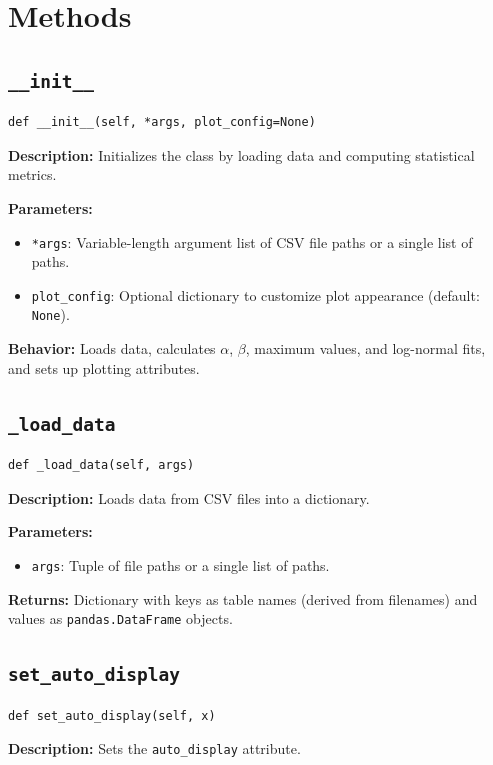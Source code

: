\documentclass[
	ngerman,							%
	a4paper,							%
	11pt,							%
	oneside							%
	]{article}							%
\begin{document}
\section{Methods}

\subsection{\texttt{\_\_init\_\_}}
\begin{lstlisting}
def __init__(self, *args, plot_config=None)
\end{lstlisting}
\textbf{Description:} Initializes the class by loading data and computing statistical metrics.

\textbf{Parameters:}
\begin{itemize}
    \item \texttt{*args}: Variable-length argument list of CSV file paths or a single list of paths.
    \item \texttt{plot\_config}: Optional dictionary to customize plot appearance (default: \texttt{None}).
\end{itemize}

\textbf{Behavior:} Loads data, calculates $\alpha$, $\beta$, maximum values, and log-normal fits, and sets up plotting attributes.

\subsection{\texttt{\_load\_data}}
\begin{lstlisting}
def _load_data(self, args)
\end{lstlisting}
\textbf{Description:} Loads data from CSV files into a dictionary.

\textbf{Parameters:}
\begin{itemize}
    \item \texttt{args}: Tuple of file paths or a single list of paths.
\end{itemize}

\textbf{Returns:} Dictionary with keys as table names (derived from filenames) and values as \texttt{pandas.DataFrame} objects.

\subsection{\texttt{set\_auto\_display}}
\begin{lstlisting}
def set_auto_display(self, x)
\end{lstlisting}
\textbf{Description:} Sets the \texttt{auto\_display} attribute.
\end{document}
